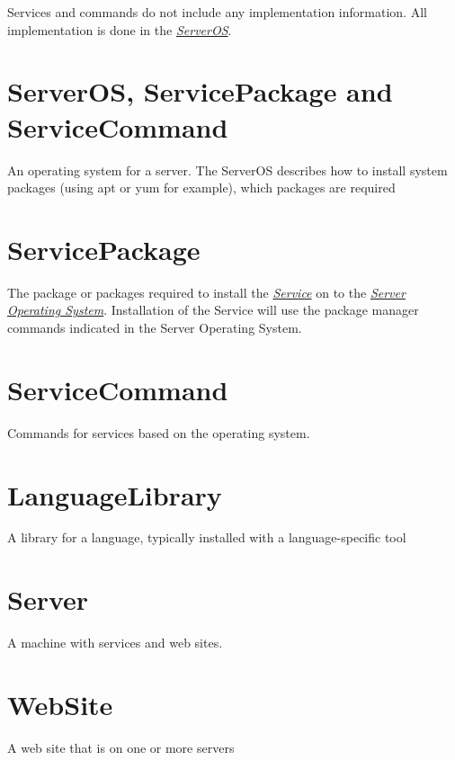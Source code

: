 \documentclass[letterpaper,10pt,english]{manual}
\begin{document}
Services and commands do not include any implementation information. All implementation is done in the \hyperlink{models-serveros}{\emph{ServerOS}}.
\hypertarget{models-serveros}{}

\section{ServerOS, ServicePackage and ServiceCommand}

An operating system for a server. The ServerOS describes how to install system packages (using apt or yum for example), which packages are required
\hypertarget{models-servicepackage}{}

\section{ServicePackage}

The package or packages required to install the \hyperlink{models-service}{\emph{Service}} on to the \hyperlink{models-serveros}{\emph{Server Operating System}}. Installation of the Service will use the package manager commands indicated in the Server Operating System.
\hypertarget{models-servicecommand}{}

\section{ServiceCommand}

Commands for services based on the operating system.
\hypertarget{models-languagelibrary}{}

\section{LanguageLibrary}

A library for a language, typically installed with a language-specific tool
\hypertarget{models-server}{}

\section{Server}

A machine with services and web sites.
\hypertarget{models-website}{}

\section{WebSite}

A web site that is on one or more servers
\end{document}
